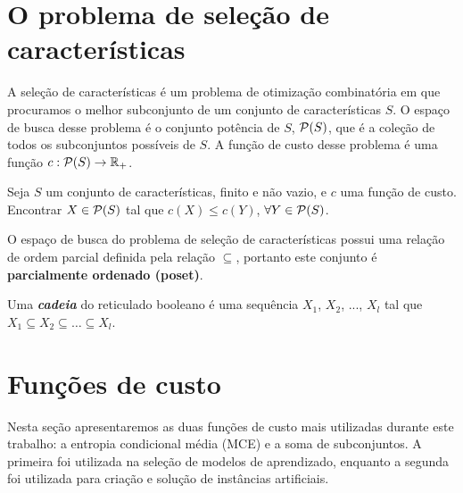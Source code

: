 
\section{O problema de seleção de características}
A seleção de características é um problema de otimização combinatória 
em que procuramos o melhor subconjunto de um conjunto de características
$S$. O espaço de busca desse problema é o conjunto potência de $S$, 
$\mathcal{P} (S)$, que é a coleção de todos os subconjuntos possíveis de
 $S$. A função de custo desse problema é uma função $c : \mathcal{P} (S) 
\to \mathbb{R}_{+}$.

\begin{mydefinition} Seja $S$
um conjunto de características, finito e não vazio, e $c$ uma função de 
custo. Encontrar $X \in \mathcal{P} (S)$ tal que $c (X) \leq c (Y)$,
$\forall Y \in \mathcal{P} (S)$.
\end{mydefinition}

O espaço de busca do problema de seleção de características possui uma
relação de ordem parcial definida pela relação $\subseteq$, portanto
este conjunto é {\bf parcialmente ordenado (poset)}.

\begin{mydefinition}
Uma {\bf \em cadeia} do reticulado booleano é uma sequência $X_1$, 
$X_2$, ..., $X_l$ tal que $X_1 \subseteq X_2 \subseteq \dots 
\subseteq X_l$.
\end{mydefinition}



\section{Funções de custo}
Nesta seção apresentaremos as duas funções de custo mais utilizadas 
durante este trabalho: a entropia condicional média (MCE) e a soma de 
subconjuntos. A primeira foi utilizada na seleção de modelos de
aprendizado, enquanto a segunda foi utilizada para criação e solução
de instâncias artificiais. 

